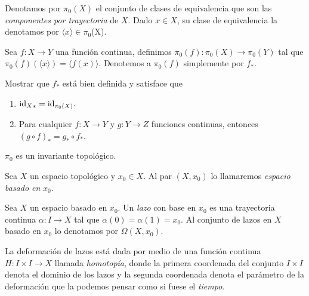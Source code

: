 
\begin{definicion}
    Denotamos por $\pi_0(X)$ el conjunto de clases de equivalencia que son las \textit{componentes por trayectoria} de $X$. Dado $x\in X$, su clase de equivalencia la denotamos por $\langle x\rangle \in \pi_0$(X). 
\end{definicion}
\begin{definicion}
\label{def: pi_0(f)}
    Sea $f:X\to Y$ una función continua, definimos $\pi_0(f):\pi_0(X)\to \pi_0(Y)$ tal que $\pi_0(f)(\langle x\rangle)=\langle f(x)\rangle$. Denotemos a $\pi_0(f)$ simplemente por $f_*$.
\end{definicion}
\begin{ejercicio}
    Mostrar que $f_*$ está bien definida y satisface que
    \begin{enumerate}[label=(\arabic*)]
        \item  ${\mathrm{id}_X}_*=\mathrm{id}_{\pi_0(X)}.$
        \item  Para cualquier $f:X\to Y$ y $g:Y\to Z$ funciones continuas, entonces $(g\circ f)_*=g_*\circ f_*$.
    \end{enumerate}
\end{ejercicio}
\begin{coro}
    $\pi_0$ es un invariante topológico.
\end{coro}
\begin{definicion}
    Sea $X$ un espacio topológico y $x_0\in X$. Al par $(X,x_0)$ lo llamaremos \textit{espacio basado en} $x_0$.
\end{definicion}
\begin{definicion}
    Sea $X$ un espacio basado en $x_0$. Un \textit{lazo} con base en $x_0$ es una trayectoria continua $\alpha:I\to X$ tal que $\alpha(0)=\alpha(1)=x_0.$ Al conjunto de lazos en $X$ basado en $x_0$ lo denotamos por $\Omega(X,x_0).$
\end{definicion}
La deformación de lazos está dada por medio de una función continua $H:I\times I\to X$ llamada \textit{homotopía}, donde la primera coordenada del conjunto $I\times I$ denota el dominio de los lazos y la segunda coordenada denota el parámetro de la deformación que la podemos pensar como si fuese el \textit{tiempo}.
